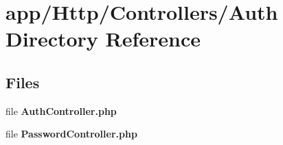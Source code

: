 \section{app/\+Http/\+Controllers/\+Auth Directory Reference}
\label{dir_544774bcf2d41001fe4f60f9eaa884c6}
\subsection*{Files}
\begin{DoxyCompactItemize}
\item 
file {\bf Auth\+Controller.\+php}
\item 
file {\bf Password\+Controller.\+php}
\end{DoxyCompactItemize}

